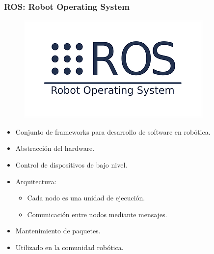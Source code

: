 \begin{frame}
	\frametitle{ROS: Robot Operating System}
    \begin{figure}[htb]
        \centering
        \includegraphics[width=0.55\columnwidth]{method/ros.png}
    \end{figure}
	\vspace{-2em}
    \begin{itemize}
 		\item Conjunto de frameworks para desarrollo de software en robótica.
        \item Abstracción del hardware.
        \item Control de dispositivos de bajo nivel.
        \item Arquitectura:
            \begin{itemize}
	        	\item Cada nodo es una unidad de ejecución.
	        	\item Comunicación entre nodos mediante mensajes.
	        \end{itemize}
        \item Mantenimiento de paquetes.
        \item Utilizado en la comunidad robótica.
    \end{itemize}
\end{frame}


